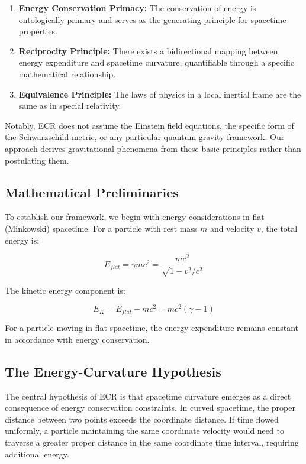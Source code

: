 \documentclass[11pt,a4paper]{article}
\begin{document}
\begin{enumerate}
    \item \textbf{Energy Conservation Primacy:} The conservation of energy is ontologically primary and serves as the generating principle for spacetime properties.
    
    \item \textbf{Reciprocity Principle:} There exists a bidirectional mapping between energy expenditure and spacetime curvature, quantifiable through a specific mathematical relationship.
    
    \item \textbf{Equivalence Principle:} The laws of physics in a local inertial frame are the same as in special relativity.
\end{enumerate}

\noindent Notably, ECR does not assume the Einstein field equations, the specific form of the Schwarzschild metric, or any particular quantum gravity framework. Our approach derives gravitational phenomena from these basic principles rather than postulating them.

\subsection{Mathematical Preliminaries}
To establish our framework, we begin with energy considerations in flat (Minkowski) spacetime. For a particle with rest mass $m$ and velocity $v$, the total energy is:

\begin{equation}
    E_{flat} = \gamma mc^2 = \frac{mc^2}{\sqrt{1-v^2/c^2}}
\end{equation}

The kinetic energy component is:

\begin{equation}
    E_K = E_{flat} - mc^2 = mc^2(\gamma - 1)
\end{equation}

For a particle moving in flat spacetime, the energy expenditure remains constant in accordance with energy conservation.

\subsection{The Energy-Curvature Hypothesis}
The central hypothesis of ECR is that spacetime curvature emerges as a direct consequence of energy conservation constraints. In curved spacetime, the proper distance between two points exceeds the coordinate distance. If time flowed uniformly, a particle maintaining the same coordinate velocity would need to traverse a greater proper distance in the same coordinate time interval, requiring additional energy.
\end{document}
